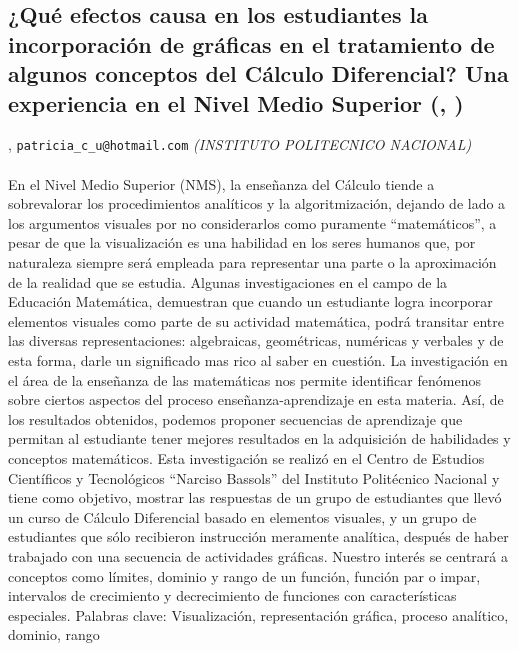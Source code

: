\subsection{\sffamily ¿Qué efectos causa en los estudiantes la incorporación de gráficas en el tratamiento de algunos conceptos del Cálculo Diferencial? Una experiencia  en el Nivel Medio Superior {\footnotesize (, )}} \label{reg-1587} 
, {\tt patricia_c_u@hotmail.com}  {\slshape (INSTITUTO POLITECNICO NACIONAL)}\\
\\
\noindent En el Nivel Medio Superior (NMS), la enseñanza del Cálculo tiende a sobrevalorar los procedimientos analíticos y la algoritmización, dejando de lado a los argumentos visuales por no considerarlos como puramente “matemáticos”, a pesar de que la visualización es una habilidad en los seres humanos que, por naturaleza siempre será empleada para representar una parte o la aproximación de la realidad que se estudia. Algunas investigaciones en el campo de la Educación Matemática, demuestran que cuando un estudiante logra incorporar elementos visuales como parte de su actividad matemática, podrá transitar entre las diversas representaciones: algebraicas, geométricas, numéricas y verbales y de esta forma, darle un significado mas rico al saber en cuestión. La investigación en el área de la enseñanza de las matemáticas nos permite identificar fenómenos sobre ciertos aspectos del proceso enseñanza-aprendizaje en esta materia. Así, de los resultados obtenidos, podemos proponer secuencias de aprendizaje que permitan al estudiante tener mejores resultados en la adquisición de habilidades y conceptos matemáticos. Esta investigación se realizó en el Centro de Estudios Científicos y Tecnológicos “Narciso Bassols” del Instituto Politécnico Nacional y tiene como objetivo, mostrar las respuestas de un grupo de estudiantes que llevó un curso de Cálculo Diferencial basado en elementos visuales, y un grupo de estudiantes que sólo recibieron instrucción meramente analítica, después de haber trabajado con una secuencia de actividades gráficas. Nuestro interés se centrará a conceptos como límites, dominio y rango de un función, función par o impar, intervalos de crecimiento y decrecimiento de funciones con características especiales.   Palabras clave: Visualización, representación gráfica, proceso analítico, dominio, rango
